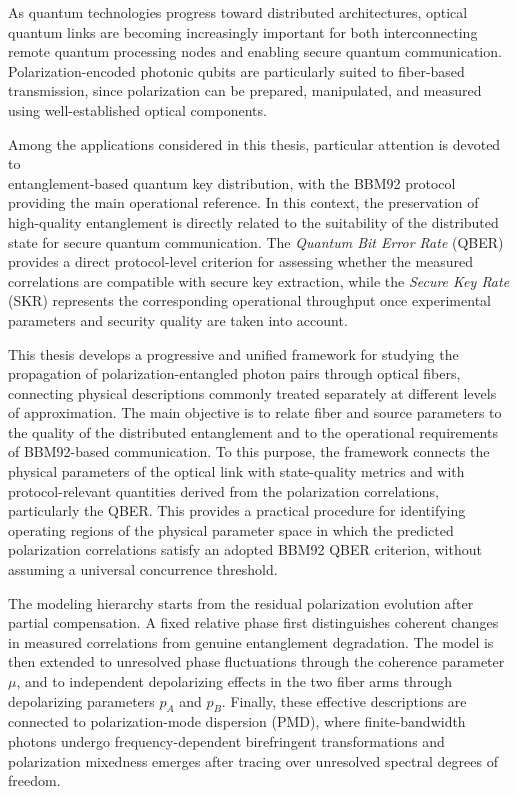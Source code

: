 
As quantum technologies progress toward distributed architectures, optical quantum links are becoming 
increasingly important for both interconnecting remote quantum processing nodes and enabling secure quantum communication. 
Polarization-encoded photonic qubits are particularly suited to fiber-based transmission, since polarization can be prepared, 
manipulated, and measured using well-established optical components.

Among the applications considered in this thesis, particular attention is devoted to \\entanglement-based quantum key distribution, 
with the BBM92 protocol providing the main operational reference. 
In this context, the preservation of high-quality entanglement is directly related to the suitability of the distributed state for secure quantum communication. 
The \textit{Quantum Bit Error Rate} (QBER) provides a direct protocol-level criterion for assessing whether the measured correlations 
are compatible with secure key extraction, while the \textit{Secure Key Rate} (SKR) represents the corresponding operational throughput once experimental 
parameters and security quality are taken into account.

This thesis develops a progressive and unified framework for studying the propagation of polarization-entangled photon pairs through optical fibers, 
connecting physical descriptions commonly treated separately at different levels of approximation. The main objective is to relate fiber and source parameters 
to the quality of the distributed entanglement and to the operational requirements of BBM92-based communication. 
To this purpose, the framework connects the physical parameters of the optical link with state-quality metrics and with protocol-relevant quantities derived from the polarization correlations, particularly the QBER.
This provides a practical procedure for identifying operating regions of the physical parameter space in which the predicted polarization correlations satisfy an adopted BBM92 QBER criterion, 
without assuming a universal concurrence threshold.

The modeling hierarchy starts from the residual polarization evolution after partial compensation. A fixed relative phase first distinguishes 
coherent changes in measured correlations from genuine entanglement degradation. The model is then extended to unresolved phase fluctuations through the coherence 
parameter \(\mu\), and to independent depolarizing effects in the two fiber arms through depolarizing parameters \(p_A\) and \(p_B\). 
Finally, these effective descriptions are connected to polarization-mode dispersion (PMD), where finite-bandwidth photons undergo frequency-dependent birefringent 
transformations and polarization mixedness emerges after tracing over unresolved spectral degrees of freedom.

